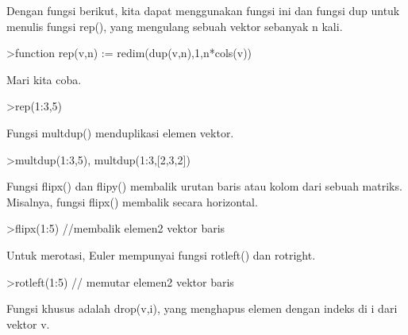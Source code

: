 \documentclass{article}
\begin{document}
\begin{eulernotebook}
\begin{eulercomment}
Dengan fungsi berikut, kita dapat menggunakan fungsi ini dan fungsi
dup untuk menulis fungsi rep(), yang mengulang sebuah vektor sebanyak
n kali.
\end{eulercomment}
\begin{eulerprompt}
>function rep(v,n) := redim(dup(v,n),1,n*cols(v))
\end{eulerprompt}
\begin{eulercomment}
Mari kita coba.
\end{eulercomment}
\begin{eulerprompt}
>rep(1:3,5)
\end{eulerprompt}
\begin{euleroutput}
  [1,  2,  3,  1,  2,  3,  1,  2,  3,  1,  2,  3,  1,  2,  3]
\end{euleroutput}
\begin{eulercomment}
Fungsi multdup() menduplikasi elemen vektor.
\end{eulercomment}
\begin{eulerprompt}
>multdup(1:3,5), multdup(1:3,[2,3,2])
\end{eulerprompt}
\begin{euleroutput}
  [1,  1,  1,  1,  1,  2,  2,  2,  2,  2,  3,  3,  3,  3,  3]
  [1,  1,  2,  2,  2,  3,  3]
\end{euleroutput}
\begin{eulercomment}
Fungsi flipx() dan flipy() membalik urutan baris atau kolom dari
sebuah matriks. Misalnya, fungsi flipx() membalik secara horizontal.
\end{eulercomment}
\begin{eulerprompt}
>flipx(1:5) //membalik elemen2 vektor baris
\end{eulerprompt}
\begin{euleroutput}
  [5,  4,  3,  2,  1]
\end{euleroutput}
\begin{eulercomment}
Untuk merotasi, Euler mempunyai fungsi rotleft() dan rotright.
\end{eulercomment}
\begin{eulerprompt}
>rotleft(1:5) // memutar elemen2 vektor baris
\end{eulerprompt}
\begin{euleroutput}
  [2,  3,  4,  5,  1]
\end{euleroutput}
\begin{eulercomment}
Fungsi khusus adalah drop(v,i), yang menghapus elemen dengan indeks di
i dari vektor v.
\end{eulercomment}

\end{eulernotebook}
\end{document}
